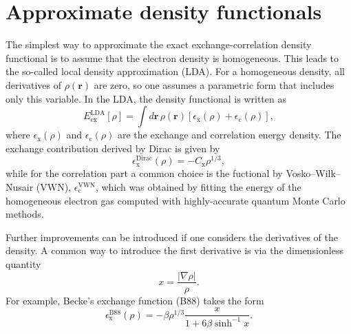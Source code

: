 \documentclass[../Main/chem532-notes.tex]{subfiles}
\begin{document}
\section{Approximate density functionals}
The simplest way to approximate the exact exchange-correlation density functional is to assume that the electron density is homogeneous.
This leads to the so-called local density approximation (LDA).
For a homogeneous density, all derivatives of $\rho(\mathbf{r})$ are zero, so one assumes a parametric form that includes only this variable.
In the LDA, the density functional is written as
\begin{equation}
E^\mathrm{LDA}_\mathrm{ex}[\rho] 
= \int d\mathbf{r} \, \rho(\mathbf{r}) [\epsilon_\mathrm{x}(\rho) + \epsilon_\mathrm{c}(\rho)],
\end{equation}
where $\epsilon_\mathrm{x}(\rho)$ and $\epsilon_\mathrm{c}(\rho)$ are the exchange and correlation energy density.
The exchange contribution derived by Dirac is given by
\begin{equation}
\epsilon^\mathrm{Dirac}_\mathrm{x}(\rho) = - C_\mathrm{x} \rho^{1/3},
\end{equation}
while for the correlation part a common choice is the fuctional by Vosko--Wilk--Nusair (VWN), $\epsilon_\mathrm{c}^\mathrm{VWN}$, which was obtained by fitting the energy of the homogeneous electron gas computed with highly-accurate quantum Monte Carlo methods.

Further improvements can be introduced if one considers the derivatives of the density. A common way to introduce the first derivative is via the dimensionless quantity
\begin{equation}
x = \frac{|\nabla\rho|}{\rho}.
\end{equation}
For example, Becke's exchange function (B88) takes the form
\begin{equation}
\epsilon^\mathrm{B88}_\mathrm{x}(\rho) = - \beta \rho^{1/3} \frac{x}{1 + 6 \beta \sinh^{-1} x}.
\end{equation}




%
%
%
\end{document}
